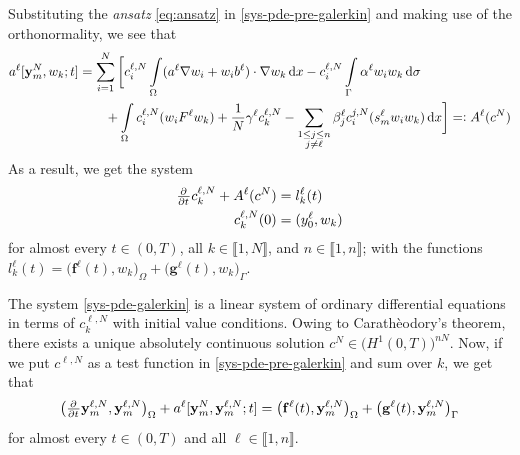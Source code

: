 \documentclass[11pt]{article}
\newcommand{\llb}{\llbracket}
\newcommand{\rrb}{\rrbracket}
\newcommand{\by}{\mathbf{y}}
\begin{document}
	Substituting the \emph{ansatz}  \eqref{eq:ansatz} in \eqref{sys-pde-pre-galerkin} and making use of the orthonormality, we see that
	\begin{align*}
		a^\ell [\mathbf y_m^{N}, w_k; t] 
		&= 
		\sum_{i=1}^N  \bigg[ c_i^{\ell,N}  \int\limits_\Omega  ( a^\ell \nabla w_i + w_i b^\ell) \cdot \nabla w_k \dif x -  c_i^{\ell, N} \int\limits_\Gamma \alpha^\ell w_i w_k \dif \sigma
		\\
		&\qquad
		+ \int\limits_\Omega 
		c_i^{\ell,N} (w_i F^\ell w_k) + \frac{1}{N}  \gamma^\ell c_k^{\ell,N} -  \sum_{\substack{1\le j\le n\\ j\neq \ell}} \beta_j^\ell c_i^{j,N} (s_{m}^\ell w_i w_k)
		 \dif x
		\bigg] =: A^\ell (c^{N})
	\end{align*}
	As a result, we get the system
	\begin{subequations}
	\label{sys-pde-galerkin}
	\begin{align}
		\pd{ }{t} c_k^{\ell,N} + A^\ell (c^{N}) &= l_k^\ell (t)		\\
		c_k^{\ell,N} (0) &= (y_0^\ell, w_k)
	\end{align}
	\end{subequations}
	for almost every \(t\in (0,T)\), all \( k\in \llb1,N\rrb\), and \(n\in \llb 1,n\rrb\); with the functions \( l^\ell_k(t) = \big( \mathbf{f}^\ell (t), w_k \big)_{\Omega} + \big(\mathbf{g}^\ell (t),  w_k \big)_{\Gamma}\).
	
	The system \eqref{sys-pde-galerkin} is a linear system of ordinary differential equations in terms of \(c_k^{\ell,N}\) with initial value conditions. Owing to Carathèodory's theorem, there exists a unique absolutely continuous solution \( c^N \in \big(H^1(0,T)\big)^{nN}\). Now, if we put \(c^{\ell,N}\) as a test function in \eqref{sys-pde-pre-galerkin} and sum over \(k\), we get that
	\begin{equation}
	\label{eq:result-galerkin}
		\big(\pd{ }{t} \by_m^{\ell,N}, \by_m^{\ell,N}\big)_\Omega + 
		a^\ell [\mathbf y_m^{N}, \by_m^{\ell,N}; t] 
		=
		\big( \mathbf{f}^\ell (t), \by_m^{\ell,N} \big)_{\Omega} + \big(\mathbf{g}^\ell (t),  \by_m^{\ell,N} \big)_{\Gamma}
	\end{equation}
	for almost every \(t\in (0,T)\) and all \(\ell \in \llb 1,n\rrb\). 
	
\end{document}
